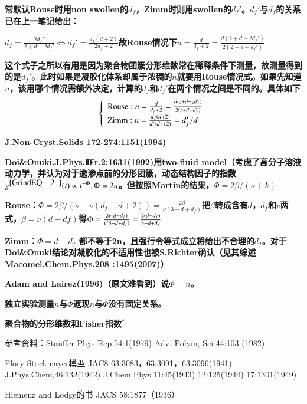 \documentclass{article} %
\begin{document}
{\bf 常默认Rouse时用non swollen的$d_{f} $，Zimm时则用swollen的$d_{f} '$。$d_{f} '$与$d_{f} $的关系已在上一笔记给出：}

\noindent 
{\bf $d_{f} =\frac{2d_{f} '}{2+d-2d_{f} '} \Leftrightarrow d_{f} '=\frac{d_{f} (d+2)}{2d_{f} +2} $故Rouse情况下$n=\frac{d}{d_{f} +2} =\frac{d(2+d-2d_{f} ')}{2(2+d-d_{f} ')} $}

\noindent 
{\bf 这个式子之所以有用是因为聚合物团簇分形维数常在稀释条件下测量，故测量得到的是$d_{f} '$。此时如果是凝胶化体系却属于浓稠的$n$就要用Rouse情况式。如果先知道$n$，该用哪个情况需额外决定，计算的$d_{f} $和$d_{f} '$在两个情况之间是不同的。具体如下
\[\left\{\begin{array}{l} {{\rm Rouse}:n=\frac{d}{d_{f} +2} =\frac{d(z+d-zd_{f} ')}{2(z+d-d_{f} ')} } \\ {{\rm Zimm}:n=\frac{d_{f} (d+2)}{d(zd_{f} +2)} =d_{f} '/d} \end{array}\right. \] }

{\bf J.Non-Cryst.Solids 172-274:1151(1994)}


{\bf  Doi\&Onuki.J.Phys.ⅡFr.2:1631(1992)用two-fluid model（考虑了高分子溶液动力学，并认为对于逾渗点前的分形团簇，动态结构因子的指数$g^{\eqref{GrindEQ__2_}} (t)\propto t^{-{\rm \Phi }} ,{\rm \Phi }=2n$。但按照Martin的结果，$\Phi =2\beta /(\nu +k)$}

\noindent 
{\bf Rouse：$\Phi =2\beta /(\nu +\nu (d_{f} -d+2))=\frac{2\beta }{\nu (3-d+d_{f} )} $把$\beta $转成含有$d$，$d_{f} $和$v$两式，$\beta =\nu \left(d-df\right)$得${\rm \Phi }=\frac{2v(d-d_{f} )}{v(3-d+d_{f} )} =\frac{2(d-d_{f} )}{3-d+d_{f} } $}

\noindent 
{\bf Zimm：$\Phi =d-d_{f} $ 都不等于2n，且强行令等式成立将给出不合理的$d_{f} $。对于Doi\&Onuki结论对凝胶化的不适用性也被S.Richter确认（见其综述Macomel.Chem.Phys.208 :1495(2007)）}


{\bf  Adam and Lairez(1996)（原文难看到）说$\Phi =n$。}


{\bf  独立实验测量$n$与$\Phi $返现$n$与$\Phi $没有固定关系。}

\noindent \eject 

\noindent \textbf{聚合物的分形维数和Fisher指数${}^{*}$}

\noindent 参考资料：Stauffer Phys Rep.54:1(1979) Adv. Polym, Sci 44:103 (1982)

\noindent Flory-Stockmayer模型  JAC8 63:3083，63:3091，63:3096(1941) J.Phys.Chem,46:132(1942) J.Chem.Phys.11:45(1943) 12:125(1944) 17:1301(1949)

\noindent Hiemenz and Lodge的书 JACS 58:1877（1936）
\end{document}

